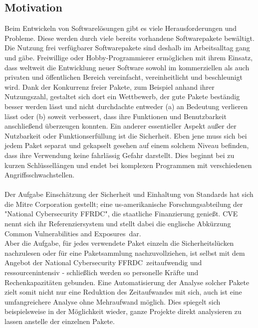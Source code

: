 \subsection{Motivation} \label{subsec:Motivation}
    Beim Entwickeln von Softwarelösungen gibt es viele Herausforderungen und Probleme. 
    Diese werden durch viele bereits vorhandene Softwarepakete bewältigt.
    Die Nutzung frei verfügbarer Softwarepakete sind deshalb im Arbeitsalltag gang und gäbe.
    Freiwillige oder Hobby-Programmierer ermöglichen mit ihrem Einsatz, dass weltweit die Entwicklung neuer Software sowohl im kommerziellen als auch privaten und öffentlichen Bereich vereinfacht, vereinheitlicht und beschleunigt wird.
    Dank der Konkurrenz freier Pakete, zum Beispiel anhand ihrer Nutzungszahl, gestaltet sich dort ein Wettbewerb, der gute Pakete beständig besser werden lässt und nicht durchdachte entweder (a) an Bedeutung verlieren lässt oder (b) soweit verbessert, dass ihre Funktionen und Benutzbarkeit anschließend überzeugen konnten.
    Ein anderer essentieller Aspekt außer der Nutzbarkeit oder Funktionserfüllung ist die Sicherheit.
    Eben jene muss sich bei jedem Paket separat und gekapselt gesehen auf einem solchem Niveau befinden, dass ihre Verwendung keine fahrlässig Gefahr darstellt.
    Dies beginnt bei zu kurzen Schlüssellängen und endet bei komplexen Programmen mit verschiedenen Angriffsschwachstellen.
    \\ \\
    Der Aufgabe Einschätzung der Sicherheit und Einhaltung von Standards hat sich die Mitre Corporation gestellt; eine us-amerikanische Forschungsabteilung der "National Cybersecurity FFRDC", die staatliche Finanzierung genießt.
    \ac{CVE} nennt sich ihr Referenziersystem und stellt dabei die englische Abkürzung \glqq Common Vulnerabilities and Exposures\grqq~dar.
    \\
    Aber die Aufgabe, für jedes verwendete Paket einzeln die Sicherheitslücken nachzulesen oder für eine Paketsammlung nachzuvollziehen, ist selbst mit dem Angebot der \glqq National Cybersecurity FFRDC\grqq~zeitaufwendig und ressourcenintensiv - schließlich werden so personelle Kräfte und Rechenkapazitäten gebunden.
    Eine Automatisierung der Analyse solcher Pakete zielt somit nicht nur eine Reduktion des Zeitaufwandes mit sich, auch ist eine umfangreichere Analyse ohne Mehraufwand möglich.
    Dies spiegelt sich beispielsweise in der Möglichkeit wieder, ganze Projekte direkt analysieren zu lassen anstelle der einzelnen Pakete.
    \\
